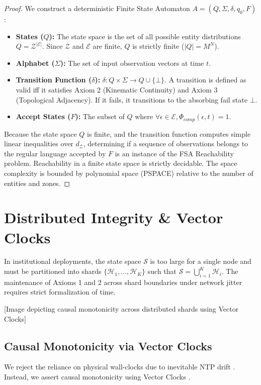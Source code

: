 \documentclass[conference]{IEEEtran}
\newcommand{\E}{\mathcal{E}} %
\newcommand{\Z}{\mathcal{Z}} %
\newcommand{\Sstate}{\mathcal{S}} %
\newcommand{\fail}{\bot} %
\begin{document}
\begin{proof}
We construct a deterministic Finite State Automaton $A = (Q, \Sigma, \delta, q_0, F)$:
\begin{itemize}
    \item \textbf{States ($Q$):} The state space is the set of all possible entity distributions $Q = \Z^{|\E|}$. Since $\Z$ and $\E$ are finite, $Q$ is strictly finite ($|Q| = M^N$).
    \item \textbf{Alphabet ($\Sigma$):} The set of input observation vectors at time $t$.
    \item \textbf{Transition Function ($\delta$):} $\delta: Q \times \Sigma \to Q \cup \{\fail\}$. A transition is defined as valid iff it satisfies Axiom 2 (Kinematic Continuity) and Axiom 3 (Topological Adjacency). If it fails, it transitions to the absorbing fail state $\fail$.
    \item \textbf{Accept States ($F$):} The subset of $Q$ where $\forall \epsilon \in \E, \Phi_{comp}(\epsilon, t) = 1$.
\end{itemize}
Because the state space $Q$ is finite, and the transition function computes simple linear inequalities over $d_\Z$, determining if a sequence of observations belongs to the regular language accepted by $F$ is an instance of the FSA Reachability problem. Reachability in a finite state space is strictly decidable. The space complexity is bounded by polynomial space (PSPACE) relative to the number of entities and zones.
\end{proof}

\section{Distributed Integrity \& Vector Clocks}

In institutional deployments, the state space $\Sstate$ is too large for a single node and must be partitioned into shards $\{\mathcal{H}_1, \dots, \mathcal{H}_K\}$ such that $\Sstate = \bigcup_{i=1}^K \mathcal{H}_i$. The maintenance of Axioms 1 and 2 across shard boundaries under network jitter requires strict formalization of time.

[Image depicting causal monotonicity across distributed shards using Vector Clocks]

\subsection{Causal Monotonicity via Vector Clocks}
We reject the reliance on physical wall-clocks due to inevitable NTP drift \cite{b8}. Instead, we assert causal monotonicity using Vector Clocks \cite{b13}. 
\end{document}
